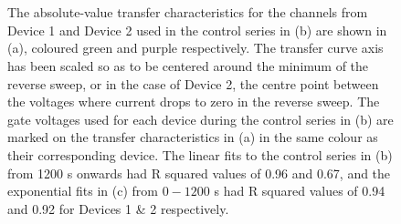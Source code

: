 \documentclass[
  a4paper,
]{scrbook}
\begin{document}
\begin{figure}
\begin{minipage}[t]{0.55\linewidth}
{{}

}

\subcaption{\label{fig-linear-fit-AZ1518}}
\end{minipage}%
\newline
\begin{minipage}[t]{0.23\linewidth}

{\centering 

~

}

\end{minipage}%
%
\begin{minipage}[t]{0.55\linewidth}

{\centering 


}

\subcaption{\label{fig-exp-fit-AZ1518}}
\end{minipage}%
%
\begin{minipage}[t]{0.23\linewidth}

{\centering 

~

}

\end{minipage}%

\caption{\label{fig-salt-conc-control-series-AZ1518}The absolute-value
transfer characteristics for the channels from Device 1 and Device 2
used in the control series in (b) are shown in (a), coloured green and
purple respectively. The transfer curve axis has been scaled so as to be
centered around the minimum of the reverse sweep, or in the case of
Device 2, the centre point between the voltages where current drops to
zero in the reverse sweep. The gate voltages used for each device during
the control series in (b) are marked on the transfer characteristics in
(a) in the same colour as their corresponding device. The linear fits to
the control series in (b) from 1200 s onwards had R squared values of
0.96 and 0.67, and the exponential fits in (c) from \(0-1200\) s had R
squared values of 0.94 and 0.92 for Devices 1 \& 2 respectively.}

\end{figure}
\end{document}
